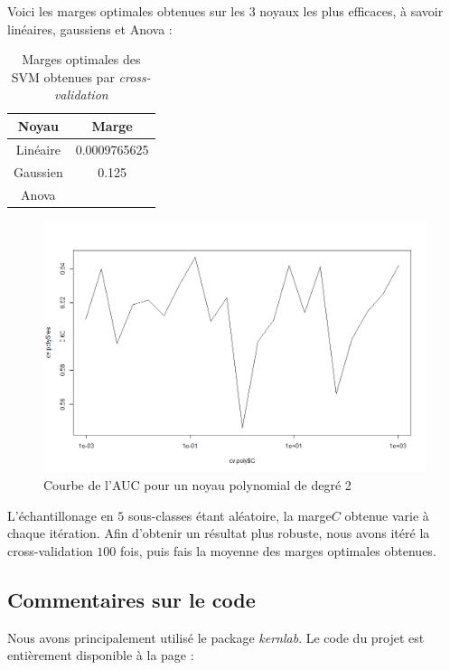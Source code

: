 \documentclass{article}
\begin{document}
Voici les marges optimales obtenues sur les 3 noyaux les plus efficaces, à savoir linéaires, gaussiens et Anova :
\begin{table}[!ht]
\center
\begin{tabular}{|c|c|}
\hline
\textbf{Noyau} & \textbf{Marge}\\
\hline
Linéaire & 0.0009765625\\
\hline
Gaussien & 0.125 \\
\hline
Anova & \\
\hline
\end{tabular}
\caption{Marges optimales des SVM obtenues par \textit{cross-validation}}
\label{Margin}
\end{table}

\begin{figure}[!h]\centering
\includegraphics[scale=0.4]{auc.png}
\caption{Courbe de l'AUC pour un noyau polynomial de degré 2}
\label{fig:AUC Poly}
\end{figure}

L'échantillonage en $5$ sous-classes étant aléatoire, la marge$C$ obtenue varie à chaque itération. Afin d'obtenir un résultat plus robuste, nous avons itéré la cross-validation $100$ fois, puis fais la moyenne des marges optimales obtenues.\\

\subsection{Commentaires sur le code}
Nous avons principalement utilisé le package \textit{kernlab}.
Le code du projet est entièrement disponible à la page :\\
\end{document}
